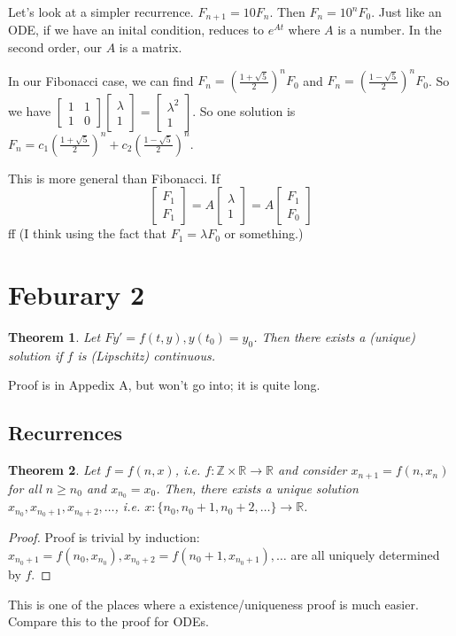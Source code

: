 \documentclass{article}
\theoremstyle{plain}
\newtheorem{theorem}{Theorem}
\theoremstyle{remark}
\newcommand{\Z}{{\mathbb Z}}
\newcommand{\R}{{\mathbb R}}
\begin{document}
Let's look at a simpler recurrence.
$F_{n+1} = 10 F_n$.
Then $F_n = 10^n F_0$.
Just like an ODE, if we have an inital condition,
reduces to $e^{At}$ where $A$ is a number.
In the second order, our $A$ is a matrix.

In our Fibonacci case, we can find
$F_n = \left(\frac{1+\sqrt{5}}{2}\right)^nF_0$
and $F_n = \left(\frac{1-\sqrt{5}}{2}\right)^nF_0$.
So we have
$\begin{bmatrix} 1 & 1 \\ 1 & 0 \end{bmatrix}
\begin{bmatrix} \lambda \\ 1 \end{bmatrix}
= \begin{bmatrix} \lambda^2 \\ 1 \end{bmatrix}$.
So one solution is $F_n = c_1\left(\frac{1+\sqrt{5}}{2}\right)^n
+ c_2\left(\frac{1-\sqrt{5}}{2}\right)^n$.

This is more general than Fibonacci.
If
\[
	\begin{bmatrix} F_1 \\ F_1 \end{bmatrix}
	= A \begin{bmatrix} \lambda \\ 1 \end{bmatrix} =
	A \begin{bmatrix} F_1 \\ F_0 \end{bmatrix}
\]
ff
(I think using the fact that $F_1 = \lambda F_0$ or something.)

\section{Feburary 2}
\begin{theorem}
	Let $Fy' = f(t,y), y(t_0) = y_0$.
	Then there exists a (unique) solution if $f$ is (Lipschitz) continuous.
\end{theorem}
Proof is in Appedix A, but won't go into; it is quite long.


\subsection{Recurrences}
\begin{theorem}
	Let $f = f(n,x)$, i.e. $f \colon \Z \times \R \to \R$ and consider
	$x_{n+1} = f(n,x_n)$ for all $n \geq n_0$ and $x_{n_0} = x_0$.
	Then, there exists a unique solution $x_{n_0}, x_{n_0+1}, x_{n_0 + 2},\dots$,
	i.e. $x \colon \{n_0, n_0 + 1, n_0 + 2,\dots \} \to \R$.
\end{theorem}
\begin{proof}
	Proof is trivial by induction:
	$x_{n_0+1} = f(n_0,x_{n_0}), x_{n_0+2} = f(n_0+1, x_{n_0+1}), \dots$
	are all uniquely determined by $f$.
\end{proof}
This is one of the places where a existence/uniqueness proof is much easier.
Compare this to the proof for ODEs.
\end{document}
